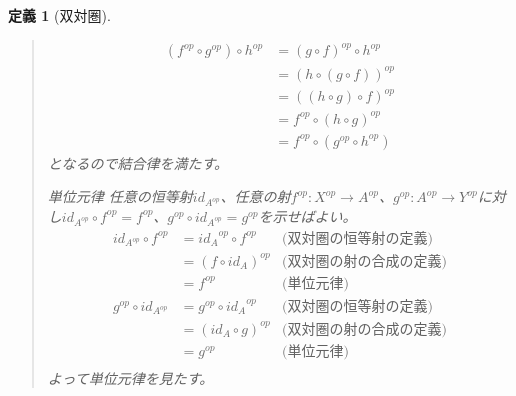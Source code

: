 \documentclass[uplatex,dvipdfmx]{jsarticle}
\newcommand{\arrow}{\rightarrow}
\newcommand{\mor}[3]{#1:#2\arrow #3}
\newtheorem{define}[proof]{定義}
\numberwithin{proof}{subsection}
\newenvironment{mydescription}
{\begin{description}
  \setlength{\parskip}{0.5cm}
}
{\end{description}}
\begin{document}
\begin{define}[双対圏]
\begin{quote}
\begin{mydescription}
				\begin{align*}
					(f^{op}\circ g^{op})\circ h^{op}&=(g\circ f)^{op}\circ h^{op}\\
					&=(h\circ(g\circ f))^{op}\\
					&=((h\circ g)\circ f)^{op}\\
					&=f^{op}\circ (h\circ g)^{op}\\
					&=f^{op}\circ (g^{op}\circ h^{op})
				\end{align*}
				となるので結合律を満たす。
				\item[単位元律]任意の恒等射$id_{A^{op}}$、任意の射$\mor{f^{op}}{X^{op}}{A^{op}}$、$\mor{g^{op}}{A^{op}}{Y^{op}}$に対し$id_{A^{op}}\circ f^{op}=f^{op}$、$g^{op}\circ id_{A^{op}}=g^{op}$を示せばよい。
				\begin{align*}
					id_{A^{op}}\circ f^{op}&={id_A}^{op}\circ f^{op}&\text{(双対圏の恒等射の定義)}\\
					&=(f\circ id_A)^{op}&\text{(双対圏の射の合成の定義)}\\
					&=f^{op}&\text{(単位元律)}\\
					g^{op}\circ id_{A^{op}}&=g^{op}\circ {id_A}^{op}&\text{(双対圏の恒等射の定義)}\\
					&=(id_A\circ g)^{op}&\text{(双対圏の射の合成の定義)}\\
					&=g^{op}&\text{(単位元律)}\\
				\end{align*}
				よって単位元律を見たす。
			\end{mydescription}
		\end{quote}
	\end{define}
	
\end{document}
